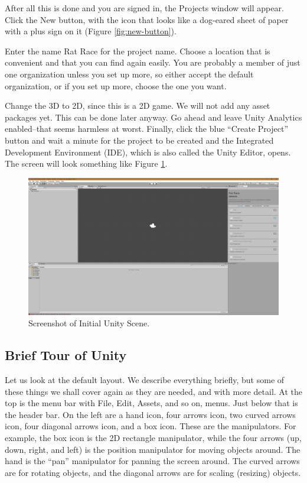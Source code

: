 \documentclass[12pt]{amsbook}
\theoremstyle{definition}
\theoremstyle{remark}
\numberwithin{figure}{chapter}
\numberwithin{table}{chapter}
\numberwithin{section}{chapter}
\numberwithin{equation}{section}
\begin{document}
After all this is done and you are signed in, the Projects window will appear.  Click the New button, with the icon that looks like a dog-eared sheet of paper with a plus sign on it (Figure \ref{fig:new-button}).

Enter the name Rat Race for the project name.  Choose a location that is convenient and that you can find again easily.  You are probably a member of just one organization unless you set up more, so either accept the default organization, or if you set up more, choose the one you want.

Change the 3D to 2D, since this is a 2D game.  We will not add any asset packages yet.  This can be done later anyway.  Go ahead and leave Unity Analytics enabled--that seems harmless at worst.  Finally, click the blue ``Create Project'' button and wait a minute for the project to be created and the Integrated Development Environment (IDE), which is also called the Unity Editor, opens. The screen will look something like Figure \ref{fig:unity}.

\begin{figure}[h]
  \includegraphics[width=6in]{Unity.png}
  \caption{Screenshot of Initial Unity Scene.}
  \label{fig:unity}
\end{figure}

\subsection{Brief Tour of Unity}

Let us look at the default layout.  We describe everything briefly, but some of these things we shall cover again as they are needed, and with more detail. At the top is the menu bar with File, Edit, Assets, and so on, menus.  Just below that is the header bar.  On the left are a hand icon, four arrows icon, two curved arrows icon, four diagonal arrows icon, and a box icon.  These are the manipulators.  For example, the box icon is the 2D rectangle manipulator, while the four arrows (up, down, right, and left) is the position manipulator for moving objects around.  The hand is the ``pan'' manipulator for panning the screen around.  The curved arrows are for rotating objects, and the diagonal arrows are for scaling (resizing) objects.
\end{document}
